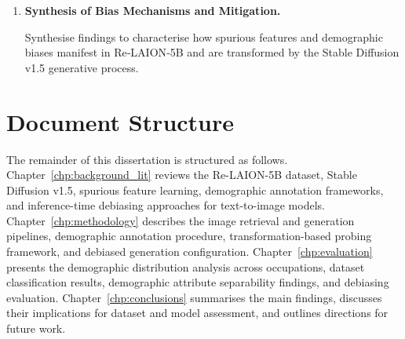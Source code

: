 \begin{enumerate}
	\item \textbf{Synthesis of Bias Mechanisms and Mitigation.}
	
	Synthesise findings to characterise how spurious features and demographic biases manifest in Re‐LAION‐5B and are transformed by the Stable Diffusion v1.5 generative process.
\end{enumerate}

\section{Document Structure}

The remainder of this dissertation is structured as follows. Chapter~\ref{chp:background_lit} reviews the Re-LAION-5B dataset, Stable Diffusion v1.5, spurious feature learning, demographic annotation frameworks, and inference-time debiasing approaches for text-to-image models. Chapter~\ref{chp:methodology} describes
the image retrieval and generation pipelines, demographic annotation procedure,
transformation-based probing framework, and debiased generation configuration.
Chapter~\ref{chp:evaluation} presents the demographic distribution analysis across
occupations, dataset classification results, demographic attribute separability findings,
and debiasing evaluation. Chapter~\ref{chp:conclusions} summarises the main findings,
discusses their implications for dataset and model assessment, and outlines directions
for future work.